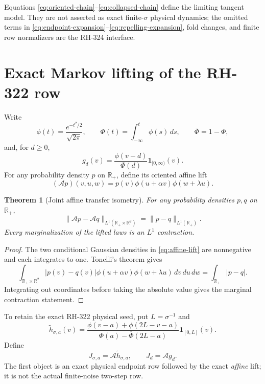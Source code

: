 \documentclass[11pt]{article}
\newtheorem{theorem}{Theorem}[section]
\theoremstyle{remark}
\newcommand{\R}{\mathbb R}
\begin{document}
Equations \eqref{eq:oriented-chain}--\eqref{eq:collapsed-chain} define the
limiting tangent model.  They are not asserted as exact finite-$\sigma$
physical dynamics; the omitted terms in
\eqref{eq:endpoint-expansion}--\eqref{eq:repelling-expansion}, fold changes,
and finite row normalizers are the RH-324 interface.

\section{Exact Markov lifting of the RH-322 row}

Write
\[
 \phi(t)=\frac{e^{-t^2/2}}{\sqrt{2\pi}},
 \qquad
 \Phi(t)=\int_{-\infty}^t\phi(s)\,ds,
 \qquad \overline\Phi=1-\Phi,
\]
and, for $d\ge0$,
\begin{equation}\label{eq:entrance-profile}
 g_d(v)=\frac{\phi(v-d)}{\Phi(d)}\mathbf1_{[0,\infty)}(v).
\end{equation}
For any probability density $p$ on $\R_+$, define its oriented affine lift
\begin{equation}\label{eq:affine-lift}
 (\mathcal A p)(v,u,w)
 =p(v)\phi(u+\alpha v)\phi(w+\lambda u).
\end{equation}

\begin{theorem}[Joint affine transfer isometry]\label{thm:isometry}
For any probability densities $p,q$ on $\R_+$,
\begin{equation}\label{eq:isometry}
 \|\mathcal A p-\mathcal A q\|_{L^1(\R_+\times\R^2)}
 =\|p-q\|_{L^1(\R_+)}.
\end{equation}
Every marginalization of the lifted laws is an $L^1$ contraction.
\end{theorem}

\begin{proof}
The two conditional Gaussian densities in \eqref{eq:affine-lift} are
nonnegative and each integrates to one.  Tonelli's theorem gives
\[
 \int_{\R_+\times\R^2}
 |p(v)-q(v)|\phi(u+\alpha v)\phi(w+\lambda u)\,dv\,du\,dw
 =\int_{\R_+}|p-q|.
\]
Integrating out coordinates before taking the absolute value gives the
marginal contraction statement.
\end{proof}

To retain the exact RH-322 physical seed, put $L=\sigma^{-1}$ and
\begin{equation}\label{eq:finite-seed}
 \widetilde h_{\sigma,a}(v)=
 \frac{\phi(v-a)+\phi(2L-v-a)}
 {\Phi(a)-\overline\Phi(2L-a)}\mathbf1_{[0,L]}(v).
\end{equation}
Define
\[
 J_{\sigma,a}=\mathcal A\widetilde h_{\sigma,a},
 \qquad J_d=\mathcal A g_d.
\]
The first object is an exact physical endpoint row followed by the exact
\emph{affine} lift; it is not the actual finite-noise two-step row.
\end{document}
